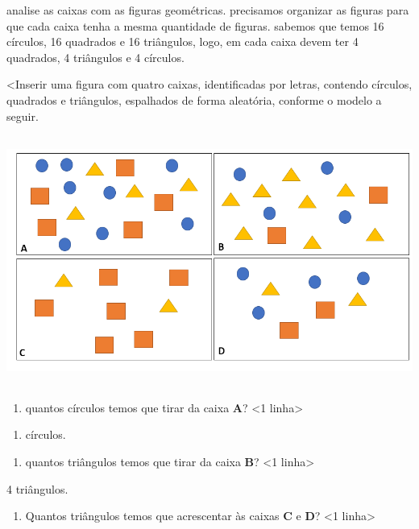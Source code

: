 analise as caixas com as figuras geométricas. precisamos organizar as
figuras para que cada caixa tenha a mesma quantidade de figuras. sabemos
que temos 16 círculos, 16 quadrados e 16 triângulos, logo, em cada caixa
devem ter 4 quadrados, 4 triângulos e 4 círculos.

\textless{}Inserir uma figura com quatro caixas, identificadas por
letras, contendo círculos, quadrados e triângulos, espalhados de forma
aleatória, conforme o modelo a seguir.

\includegraphics[width=5.90556in,height=3.22917in]{media/image20.png}

\begin{enumerate}
\def\labelenumi{\Alph{enumi})}
\item
  quantos círculos temos que tirar da caixa \textbf{A}? \textless{}1
  linha\textgreater{}
\end{enumerate}

\begin{enumerate}
\def\labelenumi{\arabic{enumi}.}
\setcounter{enumi}{3}
\item
  círculos.
\end{enumerate}

\begin{enumerate}
\def\labelenumi{\Alph{enumi})}
\item
  quantos triângulos temos que tirar da caixa \textbf{B}? \textless{}1
  linha\textgreater{}
\end{enumerate}

4 triângulos.

\begin{enumerate}
\def\labelenumi{\Alph{enumi})}
\item
  Quantos triângulos temos que acrescentar às caixas \textbf{C} e
  \textbf{D}? \textless{}1 linha\textgreater{}
\end{enumerate}

